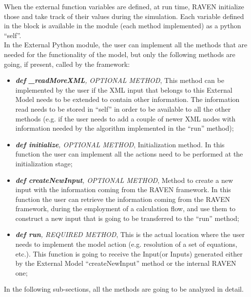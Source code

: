 When the external function variables are defined, at run time, RAVEN initialize
those and take track of their values during the simulation.
%
Each variable defined in the  block is available in the module
(each method implemented) as a python ``self''.
%
\\ In the External Python module, the user can implement all the methods that
are needed for the functionality of the model, but only the following methods
are going, if present, called by the framework:
\begin{itemize}
  \item \textit{\textbf{def \_readMoreXML}, OPTIONAL METHOD}, This
  method can be implemented by the user if the XML input that belongs to this
  External Model needs to be extended to contain other information.
  The information read needs to be stored in ``self'' in order to be available
  to all the other methods (e.g. if the user needs to add a couple of newer XML
  nodes with information needed by the algorithm implemented in the ``run''
  method);
  \item \textit{\textbf{def initialize}, OPTIONAL METHOD}, Initialization
  method.
  In this function the user can implement all the actions need to be performed
  at the initialization stage;
  \item \textit{\textbf{def createNewInput}, OPTIONAL METHOD}, Method to create
  a new input with the information coming from the RAVEN framework.
  In this function the user can retrieve the information coming from the RAVEN
  framework, during the employment of a calculation flow, and use them to
  construct a new input that is going to be transferred to the ``run'' method;
  \item \textit{\textbf{def run}, REQUIRED METHOD}, This is the actual location
  where the user needs to implement the model action (e.g. resolution of a set
  of equations, etc.).
  This function is going to receive the Input(or Inputs) generated either by the
  External Model ``createNewInput'' method or the internal RAVEN one;
\end{itemize}
In the following sub-sections, all the methods are going to be analyzed in
detail.
%
